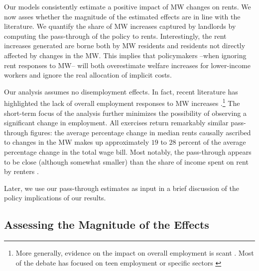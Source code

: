 
Our models consistently estimate a positive impact of MW changes on rents. We now 
asses whether the magnitude of the estimated effects are in line with the literature. 
We quantify the share of MW increases captured by landlords by computing the 
pass-through of the policy to rents. Interestingly, the rent increases generated are 
borne both by MW residents and residents not directly affected by changes in the MW.
This implies that policymakers --when ignoring rent responses to MW-- will both 
overestimate welfare increases for lower-income workers and ignore the real allocation 
of implicit costs. 

Our analysis assumes no disemployment effects. In fact, recent literature has highlighted 
the lack of overall employment responses to MW 
increases \parencite{CegnizEtAl2019}.\footnote{More generally, evidence on the impact on 
	overall employment is scant \parencite{dube2019impacts}. Most of the debate has focused 
	on teen employment \parencite{card1992using, allegretto2017credible} or specific sectors 
	\parencite{katz1992effect, card2000minimum, DubeEtAl2010}} 
The short-term focus of the analysis further minimizes the possibility of observing a 
significant change in employment. All exercises return remarkably similar pass-through 
figures: the average percentage change in median rents causally ascribed to changes in the 
MW makes up approximately $19$ to $28$ percent of the average percentage change in the total 
wage bill. Most notably, the pass-through appears to be close (although somewhat smaller) 
than the share of income spent on rent by renters \parencite{fernald2020americas}. 

Later, we use our pass-through estimates as input in a brief discussion of the policy 
implications of our results.

\subsection{Assessing the Magnitude of the Effects}\label{sec:discussion_benchmarking}

